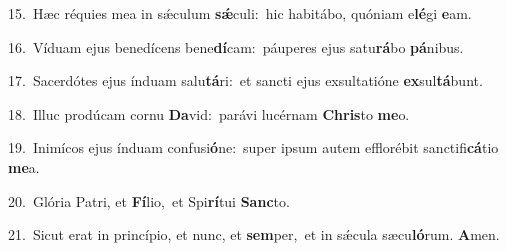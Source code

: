 {\numbfont\textcolor{\numbcolor}{15.}}~Hæc réquies mea in sǽculum \textbf{sǽ}\-culi:~\star hic habitábo, quóniam e\-\textbf{lé}\-gi \textbf{e}\-am.\par
{\numbfont\textcolor{\numbcolor}{16.}}~Víduam ejus benedícens bene\-\textbf{dí}\-cam:~\star páuperes ejus satu\-\textbf{rá}\-bo \textbf{pá}\-nibus.\par
{\numbfont\textcolor{\numbcolor}{17.}}~Sacerdótes ejus índuam salu\-\textbf{tá}\-ri:~\star et sancti ejus exsultatióne \textbf{ex}\-sul\-\textbf{tá}\-bunt.\par
{\numbfont\textcolor{\numbcolor}{18.}}~Illuc prodúcam cornu \textbf{Da}\-vid:~\star parávi lucérnam \textbf{Chris}\-to \textbf{me}\-o.\par
{\numbfont\textcolor{\numbcolor}{19.}}~Inimícos ejus índuam confusi\-\textbf{ó}\-ne:~\star super ipsum autem efflorébit sanctifi\-\textbf{cá}\-tio \textbf{me}\-a.\par
{\numbfont\textcolor{\numbcolor}{20.}}~Glória Patri, et \textbf{Fí}\-lio,~\star et Spi\-\textbf{rí}\-tui \textbf{Sanc}\-to.\par
{\numbfont\textcolor{\numbcolor}{21.}}~Sicut erat in princípio, et nunc, et \textbf{sem}\-per,~\star et in sǽcula sæcu\-\textbf{ló}\-rum. \textbf{A}\-men.\par

